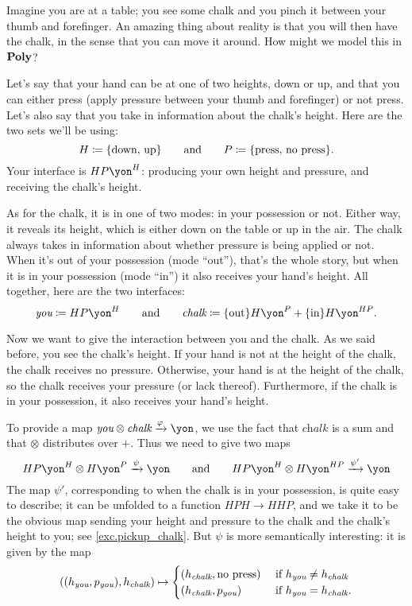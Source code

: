 \documentclass[Book-Poly]{subfiles}
\begin{document}
\begin{example}\label{ex.pickup_chalk}
Imagine you are at a table; you see some chalk and you pinch it between your thumb and forefinger. An amazing thing about reality is that you will then have the chalk, in the sense that you can move it around. How might we model this in $\mathbf{Poly}$?

Let's say that your hand can be at one of two heights, down or up, and that you can either press (apply pressure between your thumb and forefinger) or not press. Let's also say that you take in information about the chalk's height. Here are the two sets we'll be using:
\[
	H\coloneqq\{\text{down, up}\}
	\qquad\text{and}\qquad
	P\coloneqq\{\text{press, no press}\}.
\]
Your interface is $HP\yon^H$: producing your own height and pressure, and receiving the chalk's height.

As for the chalk, it is in one of two modes: in your possession or not. Either way, it reveals its height, which is either down on the table or up in the air. The chalk always takes in information about whether pressure is being applied or not. When it's out of your possession (mode ``out''), that's the whole story, but when it is in your possession (mode ``in'') it also receives your hand's height. All together, here are the two interfaces:
\[
	\textit{you}\coloneqq HP\yon^H
	\qqand
	\textit{chalk}\coloneqq \{\text{out}\}H\yon^P + \{\text{in}\}H\yon^{HP}.
\]

Now we want to give the interaction between you and the chalk.
As we said before, you see the chalk's height.
If your hand is not at the height of the chalk, the chalk receives no pressure.
Otherwise, your hand is at the height of the chalk, so the chalk receives your pressure (or lack thereof).
Furthermore, if the chalk is in your possession, it also receives your hand's height. 

To provide a map $\textit{you}\otimes\textit{chalk}\To{\varphi}\yon$, we use the fact that $\textit{chalk}$ is a sum and that $\otimes$ distributes over $+$. Thus we need to give two maps
\[
	HP\yon^H\otimes H\yon^P\To{\psi}\yon
	\qqand
	HP\yon^H\otimes H\yon^{HP}\To{\psi'}\yon
\]
The map $\psi'$, corresponding to when the chalk is in your possession, is quite easy to describe; it can be unfolded to a function
$HPH\to HHP$, and we take it to be the obvious map sending your height and pressure to the chalk and the chalk's height to you; see \cref{exc.pickup_chalk}. But $\psi$ is more semantically interesting: it is given by the map
\[
  ((h_\textit{you},p_\textit{you}),h_\textit{chalk})\mapsto
  \begin{cases}
  	(h_\textit{chalk},\text{no press}) & \textnormal{ if } h_\textit{you} \neq h_\textit{chalk} \\
  	(h_\textit{chalk},p_\textit{you}) & \textnormal{ if } h_\textit{you} = h_\textit{chalk}.
  \end{cases}
\]


\end{example}
\end{document}

